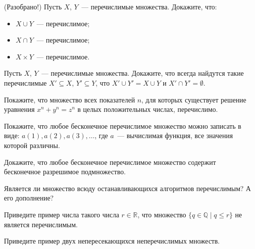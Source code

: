 \setcounter{curtask}{1}


\begin{task} (Разобрано!)
    Пусть $X$, $Y$~--- перечислимые множества. Докажите, что:
    \begin{itemize}
	    \item $X \cup Y$~--- перечислимое;
	    \item $X \cap Y$~--- перечислимое;
      	\item $X \times Y$~--- перечислимое.
    \end{itemize}
\end{task}

\begin{task}
    Пусть $X$, $Y$~--- перечислимые множества. Докажите, что всегда найдутся такие
    перечислимые $X' \subseteq X$, $Y' \subseteq Y$, что $X' \cup Y' = X \cup Y$ и
    $X' \cap Y' = \emptyset$.
\end{task}

\begin{task}
    Покажите, что множество всех показателей $n$, для которых существует решение
    уравнения $x^n + y^n = z^n$ в целых положительных числах, перечислимо.
\end{task}

\begin{task}
    Покажите, что любое бесконечное перечислимое множество можно
    записать в виде: ${a(1), a(2), a(3), \dots}$, где $a$~---
    вычислимая функция, все значения которой различны.
\end{task}

\begin{task}
    Докажите, что любое бесконечное перечислимое множество содержит бесконечное
    разрешимое подмножество.
\end{task}

\begin{task}
    Является ли множество всюду останавливающихся алгоритмов перечислимым? А его
    дополнение?
\end{task}

\begin{task}
    Приведите пример числа такого числа $r \in \mathbb{R}$, что множество $\{q \in
    \mathbb{Q} \mid q \le r\}$ не является перечислимым.
\end{task}

\begin{task}
    Приведите пример двух непересекающихся неперечислимых множеств.
\end{task}
